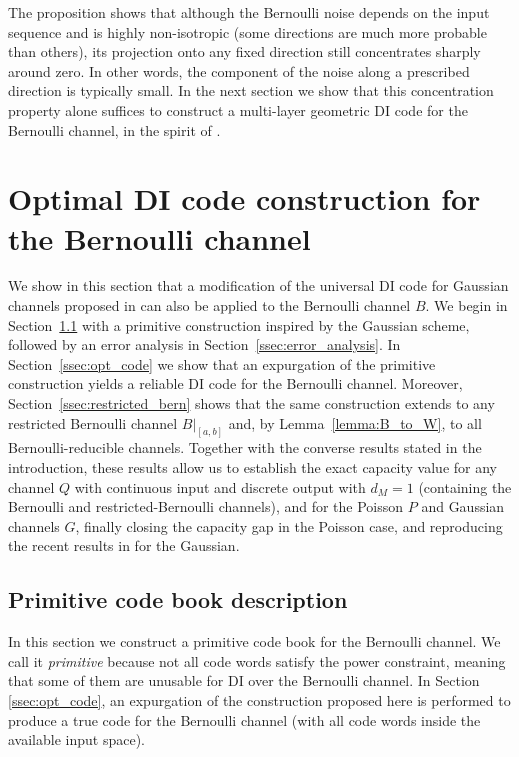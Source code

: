\documentclass[10pt, conference]{IEEEtran}
\newcommand{\1}{\mathds{1}}
\begin{document}
The proposition shows that although the Bernoulli noise depends on the input sequence and is highly non-isotropic (some directions are much more probable than others), its projection onto any fixed direction still concentrates sharply around zero. In other words, the component of the noise along a prescribed direction is typically small. In the next section we show that this concentration property alone suffices to construct a multi-layer geometric DI code for the Bernoulli channel, in the spirit of \cite{CDBW:Gauss}.








\section{Optimal DI code construction for the Bernoulli channel}\label{sec:optimal_bern}
We show in this section that a modification of the universal DI code for Gaussian channels proposed in \cite{CDBW:Gauss} can also be applied to the Bernoulli channel $B$. We begin in Section~\ref{ssec:primitive} with a primitive construction inspired by the Gaussian scheme, followed by an error analysis in Section~\ref{ssec:error_analysis}. In Section~\ref{ssec:opt_code} we show that an expurgation of the primitive construction yields a reliable DI code for the Bernoulli channel. Moreover, Section~\ref{ssec:restricted_bern} shows that the same construction extends to any restricted Bernoulli channel $B|_{[a,b]}$ and, by Lemma~\ref{lemma:B_to_W}, to all Bernoulli-reducible channels. Together with the converse results stated in the introduction, these results allow us to establish the exact capacity value for any channel $Q$ with continuous input and discrete output with $d_M=1$ (containing the Bernoulli and restricted-Bernoulli channels), and for the Poisson $P$ and Gaussian channels $G$, finally closing the capacity gap in the Poisson case, and reproducing the recent results in \cite{CDBW:Gauss} for the Gaussian.

\subsection{Primitive code book description}\label{ssec:primitive}
In this section we construct a primitive code book for the Bernoulli channel. We call it \emph{primitive} because not all code words satisfy the power constraint, meaning that some of them are unusable for DI over the Bernoulli channel. In Section \ref{ssec:opt_code}, an expurgation of the construction proposed here is performed to produce a true code for the Bernoulli channel (with all code words inside the available input space).
\end{document}
